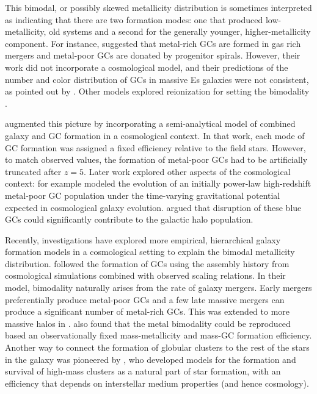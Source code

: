 \documentclass[useAMS,usenatbib]{mn2e}
\begin{document}
This bimodal, or possibly skewed metallicity distribution \citep[e.g.,][]{Strader2003, Peng2006} is sometimes interpreted as indicating that there are two formation modes: one that produced low-metallicity, old systems and a second for the generally younger, higher-metallicity component.  For instance, \citet{Ashman1992} suggested that metal-rich GCs are formed in gas rich mergers and metal-poor GCs are donated by progenitor spirals.  However, their work did not incorporate a cosmological model, and their predictions of the number and color distribution of GCs in massive Es galaxies were not consistent, as pointed out by \citet{Forbes1997}.  Other models explored reionization for setting the bimodality \citep[e.g.,][]{Santos2003, Harris1994}.

\citet{Beasley2002} augmented this picture by incorporating a semi-analytical model of combined galaxy and GC formation in a cosmological context. In that work, each mode of GC formation was assigned a fixed efficiency relative to the field stars. However, to match observed values, the formation of metal-poor GCs had to be artificially truncated after $z = 5$.  Later work explored other aspects of the cosmological context: for example \citet{Prieto2008} modeled the evolution of an initially power-law high-redshift metal-poor GC population under the time-varying gravitational potential expected in cosmological galaxy evolution.  \citet{Boley2009} argued that disruption of these blue GCs could significantly contribute to the galactic halo population.  

Recently, investigations have explored more empirical, hierarchical galaxy formation models in a cosmological setting to explain the bimodal metallicity distribution.   \citet{Muratov2010} followed the formation of GCs using the assembly history from cosmological simulations combined with observed scaling relations. In their model, bimodality naturally arises from the rate of galaxy mergers. Early mergers preferentially produce metal-poor GCs and a few late massive mergers can produce a significant number of metal-rich GCs.  This was extended to more massive halos in \citet{Li2014}.     \citet{Tonini2013} also found that the metal bimodality could be reproduced based an observationally fixed mass-metallicity and mass-GC formation efficiency.   Another way to connect the formation of globular clusters to the rest of the stars in the galaxy was pioneered by \citet{Kruijssen2015}, who developed models for the formation and survival of high-mass clusters as a natural part of star formation, with an efficiency that depends on interstellar medium properties (and hence cosmology).
\end{document}

